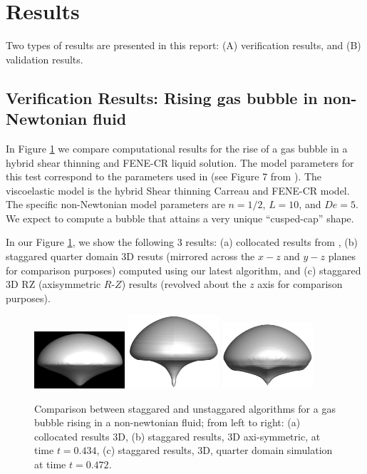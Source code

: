 \documentclass[]{article}
\begin{document}
\section{Results} 

Two types of results are presented in this report: (A) verification results, 
and (B) validation results.

\subsection{Verification Results: Rising gas bubble in non-Newtonian fluid}

In Figure \ref{gasbubblecompare} we compare computational results
for the rise of a gas bubble in a hybrid shear thinning and
FENE-CR liquid solution\cite{OHTA201966}.  The model parameters
for this test correspond to the parameters used in \cite{OHTA201966}
(see Figure 7 from \cite{OHTA201966}).  
The viscoelastic model is the hybrid
Shear thinning Carreau and FENE-CR model.  The specific non-Newtonian
model parameters are $n=1/2$, $L=10$, and $De=5$.
We expect to compute a bubble that attains
a very unique ``cusped-cap'' shape.

In our Figure \ref{gasbubblecompare}, we show the following 3 results:
(a) collocated results from \cite{OHTA201966},
(b) staggared quarter domain 3D resuts (mirrored across the $x-z$ and $y-z$ 
planes for comparison purposes) computed using our latest algorithm,
and 
(c) staggared 3D RZ (axisymmetric $R$-$Z$) results (revolved about the 
$z$ axis for comparison purposes).


\begin{figure}[htpb]
\centering
\includegraphics[width=0.3\textwidth]{collocated.png}
\includegraphics[width=0.3\textwidth]{staggared_rz_p434.png}
\includegraphics[width=0.3\textwidth]{staggared_qtr_p472.png}
\caption{Comparison between staggared and unstaggared algorithms for a
	gas bubble rising in a non-newtonian fluid; from left to right:
	(a) collocated results 3D, (b) staggared results, 3D axi-symmetric,
	at time $t=0.434$, (c) staggared results, 3D, quarter domain simulation
	at time $t=0.472$. \label{gasbubblecompare} }
\end{figure}
\end{document}

